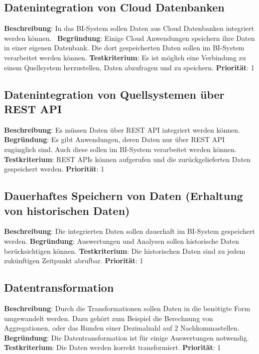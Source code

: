 \subsection{Datenintegration von Cloud Datenbanken} \label{sec:anforderungsspezifikation:datenintegrationCloudDB}
\textbf{Beschreibung}: In das BI-System sollen Daten aus Cloud Datenbanken integriert werden können.  
\newline \textbf{Begründung}: Einige Cloud Anwendungen speichern ihre Daten in einer eigenen Datenbank. Die dort gespeicherten Daten sollen im BI-System verarbeitet werden können.
\newline \textbf{Testkriterium}: Es ist möglich eine Verbindung zu einem Quellsystem herzustellen, Daten abzufragen und zu speichern.
\newline \textbf{Priorität}: 1

\subsection{Datenintegration von Quellsystemen über REST API} \label{sec:anforderungsspezifikation:datenintegrationREST}
\textbf{Beschreibung}: Es müssen Daten über REST API integriert werden können. 
\newline \textbf{Begründung}: Es gibt Anwendungen, deren Daten nur über REST API zugänglich sind. Auch diese sollen im BI-System verarbeitet werden können.
\newline \textbf{Testkriterium}: REST APIs können aufgerufen und die zurückgelieferten Daten gespeichert werden.
\newline \textbf{Priorität}: 1

\subsection[Langfristige Datenspeicherung]{Dauerhaftes Speichern von Daten (Erhaltung von historischen Daten)} \label{sec:anforderungsspezifikation:dauerhaftesSpeichern}
\textbf{Beschreibung}: Die integrierten Daten sollen dauerhaft im BI-System gespeichert werden.
\newline \textbf{Begründung}: Auswertungen und Analysen sollen historische Daten berücksichtigen können.
\newline \textbf{Testkriterium}: Die historischen Daten sind zu jedem zukünftigen Zeitpunkt abrufbar.
\newline \textbf{Priorität}: 1

\subsection{Datentransformation} \label{sec:anforderungsspezifikation:datentransformation}
\textbf{Beschreibung}: Durch die Transformationen sollen Daten in die benötigte Form umgewandelt werden. Dazu gehört zum Beispiel die Berechnung von Aggregationen, oder das Runden einer Dezimalzahl auf 2 Nachkommastellen.
\newline \textbf{Begründung}: Die Datentransformation ist für einige Auswertungen notwendig.
\newline \textbf{Testkriterium}: Die Daten werden korrekt transformiert.
\newline \textbf{Priorität}: 1

